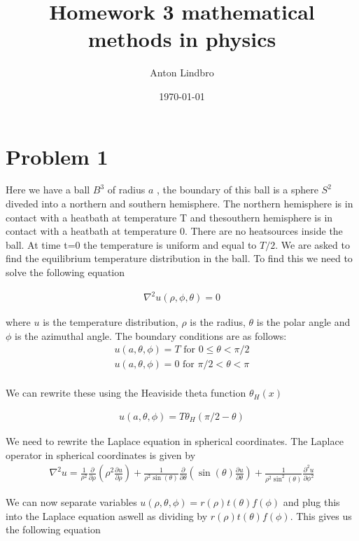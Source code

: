 \documentclass[a4paper]{article}
\title{Homework 3 mathematical methods in physics}
\author{Anton Lindbro}
\date{\today}
\begin{document}
\maketitle

\section*{Problem 1}

Here we have a ball $B^3$ of radius $a$ , the boundary of this ball is a sphere $S^2$ diveded into a northern and southern hemisphere. The northern hemisphere is in contact with a heatbath at temperature T and thesouthern hemisphere is in contact with a heatbath at temperature 0. There are no heatsources inside the ball. At time t=0 the temperature is uniform and equal to $T/2$. We are asked to find the equilibrium temperature distribution in the ball. To find this we need to solve the following equation

\begin{align*}
    \nabla^2 u(\rho,\phi,\theta) = 0
\end{align*}

where $u$ is the temperature distribution, $\rho$ is the radius, $\theta$ is the polar angle and $\phi$ is the azimuthal angle. The boundary conditions are as follows:
\begin{align*}
    u(a,\theta,\phi) = T \text{ for } 0 \leq \theta < \pi/2 \\
    u(a,\theta,\phi) = 0 \text{ for } \pi/2 < \theta < \pi \\
\end{align*}

We can rewrite these using the Heaviside theta function $\theta_H(x)
$

\begin{align*}
    u(a,\theta,\phi) = T \theta_H(\pi/2 - \theta)
\end{align*}

We need to rewrite the Laplace equation in spherical coordinates. The Laplace operator in spherical coordinates is given by
\begin{align*}
    \nabla^2 u = \frac{1}{\rho^2} \frac{\partial}{\partial \rho} \left( \rho^2 \frac{\partial u}{\partial \rho} \right) + \frac{1}{\rho^2 \sin(\theta)} \frac{\partial}{\partial \theta} \left( \sin(\theta) \frac{\partial u}{\partial \theta} \right) + \frac{1}{\rho^2 \sin^2(\theta)} \frac{\partial^2 u}{\partial \phi^2}
\end{align*}

We can now separate variables $u(\rho,\theta,\phi) = r(\rho)t(\theta)f(\phi)$ and plug this into the Laplace equation aswell as dividing by $r(\rho)t(\theta)f(\phi)$. This gives us the following equation
\end{document}
